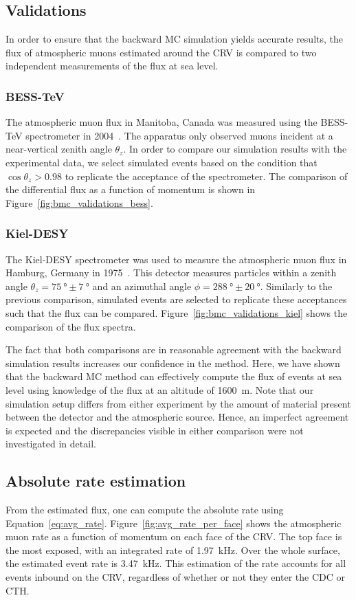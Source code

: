 \subsection{Validations}
In order to ensure that the backward MC simulation yields accurate results, the
flux of atmospheric muons estimated around the CRV is compared to two
independent measurements of the flux at sea level.

\subsubsection{BESS-TeV}
The atmospheric muon flux in Manitoba, Canada was measured using the BESS-TeV
spectrometer in 2004~\cite{besstev}. The apparatus only observed muons incident
at a near-vertical zenith angle $\theta_z$. In order to compare our simulation
results with the experimental data, we select simulated events based on the
condition that $\cos \theta_z > 0.98$ to replicate the acceptance of the
spectrometer. The comparison of the differential flux as a function of momentum
is shown in Figure~\ref{fig:bmc_validations_bess}.

\subsubsection{Kiel-DESY}
The Kiel-DESY spectrometer was used to measure the atmospheric muon flux in
Hamburg, Germany in 1975~\cite{kieldesy}. This detector measures particles
within a zenith angle $\theta_z =\SI{75}{\degree} \pm \SI{7}{\degree}$ and an
azimuthal angle $\phi = \SI{288}{\degree} \pm \SI{20}{\degree}$. Similarly to
the previous comparison, simulated events are selected to replicate these
acceptances such that the flux can be compared.
Figure~\ref{fig:bmc_validations_kiel} shows the comparison of the flux spectra.


The fact that both comparisons are in reasonable agreement with the backward
simulation results increases our confidence in the method. Here, we have shown
that the backward MC method can effectively compute the flux of events at sea
level using knowledge of the flux at an altitude of \SI{1600}{\metre}. Note that
our simulation setup differs from either experiment by the amount of material
present between the detector and the atmospheric source. Hence, an imperfect
agreement is expected and the discrepancies visible in either comparison were not
investigated in detail.

\subsection{Absolute rate estimation}
From the estimated flux, one can compute the absolute rate using
Equation~\ref{eq:avg_rate}. Figure~\ref{fig:avg_rate_per_face} shows the
atmospheric muon rate as a function of momentum on each face of the CRV. The top
face is the most exposed, with an integrated rate of \SI{1.97}{\kHz}. Over the
whole surface, the estimated event rate is \SI{3.47}{\kHz}. This estimation of
the rate accounts for all events inbound on the CRV, regardless of whether or
not they enter the CDC or CTH. 


